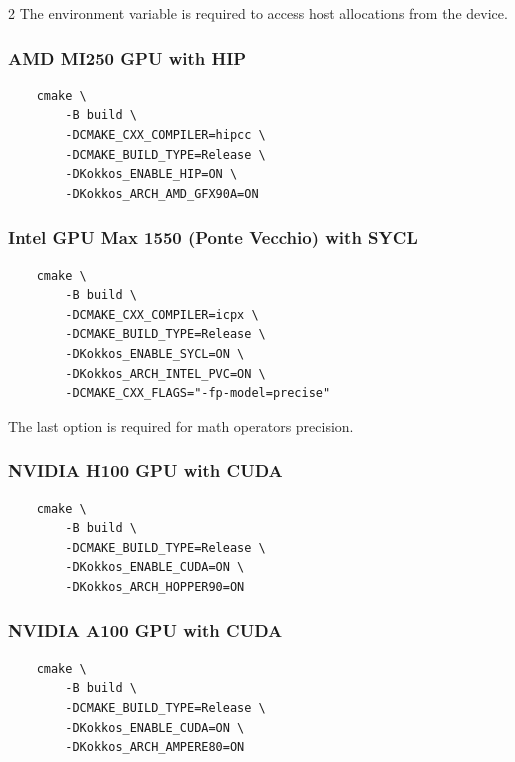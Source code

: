 \documentclass[
    kokkoshighlight,
]{./cheat_sheet_kokkos}
\begin{document}
\begin{multicols}{2}
The environment variable is required to access host allocations from the device.

\subsubsection{AMD MI250 GPU with HIP}

\begin{verbatim}
    cmake \
        -B build \
        -DCMAKE_CXX_COMPILER=hipcc \
        -DCMAKE_BUILD_TYPE=Release \
        -DKokkos_ENABLE_HIP=ON \
        -DKokkos_ARCH_AMD_GFX90A=ON
\end{verbatim}

\subsubsection{Intel GPU Max 1550 (Ponte Vecchio) with SYCL}

\begin{verbatim}
    cmake \
        -B build \
        -DCMAKE_CXX_COMPILER=icpx \
        -DCMAKE_BUILD_TYPE=Release \
        -DKokkos_ENABLE_SYCL=ON \
        -DKokkos_ARCH_INTEL_PVC=ON \
        -DCMAKE_CXX_FLAGS="-fp-model=precise"
\end{verbatim}

The last option is required for math operators precision.

\subsubsection{NVIDIA H100 GPU with CUDA}

\begin{verbatim}
    cmake \
        -B build \
        -DCMAKE_BUILD_TYPE=Release \
        -DKokkos_ENABLE_CUDA=ON \
        -DKokkos_ARCH_HOPPER90=ON
\end{verbatim}

\subsubsection{NVIDIA A100 GPU with CUDA}

\begin{verbatim}
    cmake \
        -B build \
        -DCMAKE_BUILD_TYPE=Release \
        -DKokkos_ENABLE_CUDA=ON \
        -DKokkos_ARCH_AMPERE80=ON
\end{verbatim}

\end{multicols}






\end{document}
